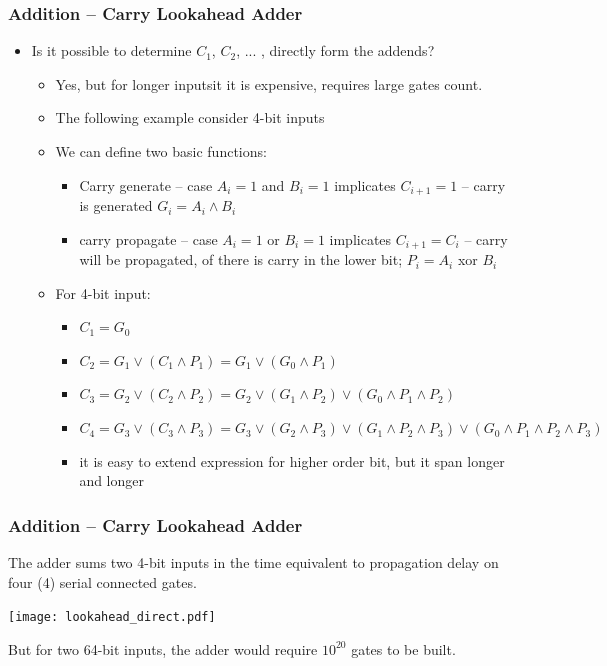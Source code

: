 \documentclass{beamer}
\begin{document}
\begin{frame}
\frametitle{Addition -- Carry Lookahead Adder}

\begin{itemize}
\item Is it possible to determine $C_1$, $C_2$, ... , directly form the addends?
\begin{itemize}
\item Yes, but for longer inputsit it is expensive, requires large gates count.
\item The following example consider 4-bit inputs
\item We can define two basic functions:
\begin{itemize}
\item Carry generate -- case $A_i=1$ and $B_i=1$ implicates $C_{i+1}=1$ -- carry is generated $G_i=A_i \land B_i$ 
\item carry propagate -- case $A_i=1$ or $B_i=1$ implicates $C_{i+1}=C_{i}$ -- carry will be propagated, of there is carry in the lower bit; $P_i=A_i$ xor $B_i$ 
\end{itemize}
\item For 4-bit input:
\begin{itemize}
\item $C_1=G_0$ 
\item $C_2=G_1 \lor (C_1 \land P_1)= G_1 \lor (G_0 \land P_1)$
\item $C_3=G_2 \lor (C_2 \land P_2)= G_2 \lor (G_1 \land P_2) \lor (G_0 \land P_1 \land P_2)$ 
\item $C_4=G_3 \lor (C_3 \land P_3)= G_3 \lor (G_2 \land P_3) \lor (G_1 \land P_2 \land P_3) \lor (G_0 \land P_1 \land P_2 \land P_3)$
\item it is easy to extend expression for higher order bit, but it span longer and longer
\end{itemize}
\end{itemize}
\end{itemize}

\end{frame}

\begin{frame}
\frametitle{Addition -- Carry Lookahead Adder}

The adder sums two 4-bit inputs in the time equivalent to propagation delay on four (4) serial connected gates.

\begin{center}
   \texttt{[image: lookahead\_direct.pdf]}
\end{center}

But for two 64-bit inputs, the adder would require $10^{20}$ gates to be built.
\end{frame}
\end{document}

